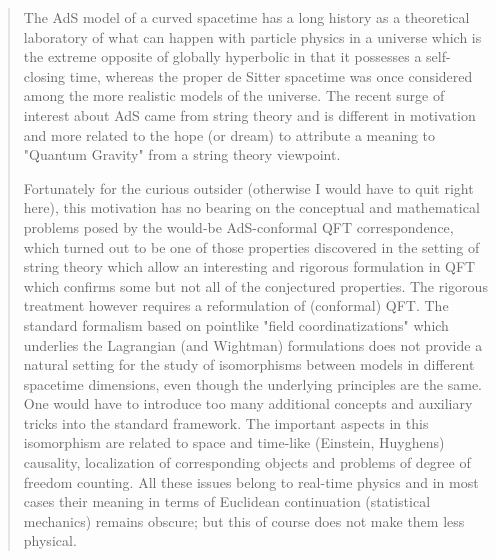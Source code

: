 \begin{quote}
      The AdS model of a curved spacetime has a long history as a
      theoretical laboratory of what can happen with particle physics
      in a universe which is the extreme opposite of globally hyperbolic
      in that it possesses a self-closing time, whereas the proper 
      de Sitter spacetime was once considered among the more realistic
      models of the universe.  The recent surge of interest about AdS
      came from string theory and is different in motivation and more 
      related to the hope (or dream) to attribute a meaning to "Quantum
      Gravity" from a string theory viewpoint.

      Fortunately for the curious outsider (otherwise I would have to
      quit right here), this motivation has no bearing on the conceptual
      and mathematical problems posed by the would-be AdS-conformal QFT
      correspondence, which turned out to be one of those properties 
      discovered in the setting of string theory which allow an interesting
      and rigorous formulation in QFT which confirms some but not all of
      the conjectured properties.  The rigorous treatment however requires
      a reformulation of (conformal) QFT.  The standard formalism based
      on pointlike "field coordinatizations" which underlies the    
      Lagrangian
      (and Wightman) formulations does not provide a natural setting for 
      the study of isomorphisms between models in different spacetime 
      dimensions, even though the underlying principles are the same.  
      One would have to introduce too many additional concepts and 
      auxiliary tricks into the standard framework.  The important 
      aspects in this isomorphism are related to space and time-like 
      (Einstein, Huyghens) causality, localization of corresponding 
      objects and problems of degree of freedom counting.  All these 
      issues belong to real-time physics and in most cases their meaning
      in terms of Euclidean continuation (statistical mechanics) remains
      obscure; but this of course does not make them less physical.


\end{quote}
